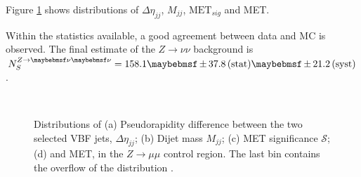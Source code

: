 Figure \ref{FIGURE:ParkedDataAnalysis_ZBackground_KeyDistributions} shows distributions of $\Delta\eta_{jj}$, $M_{jj}$, $\text{MET}_{sig}$ and \gls{MET}.

Within the statistics available, a good agreement between data and MC is observed. The final estimate of the $Z\rightarrow \nu\nu$ background is $N_{S}^{Z\rightarrow\nu\nu}= 158.1 \pm 37.8 \stat \pm 21.2 \syst$.
% 
\begin{figure}[!htb]
\centering
{}
 \\
\caption{Distributions of (a) Pseudorapidity difference between the two selected \gls{VBF} jets, $\Delta\eta_{jj}$; (b) Dijet mass $M_{jj}$; (c) \gls{MET} significance $\mathcal{S}$; (d) and \gls{MET}, in the $Z\rightarrow \mu\mu$ control region. The last bin contains the overflow of the distribution \cite{ARTICLE:CMSVBFHiggsInvisibleParkedAnalysisPAS}.}
\label{FIGURE:ParkedDataAnalysis_ZBackground_KeyDistributions}
\end{figure}

